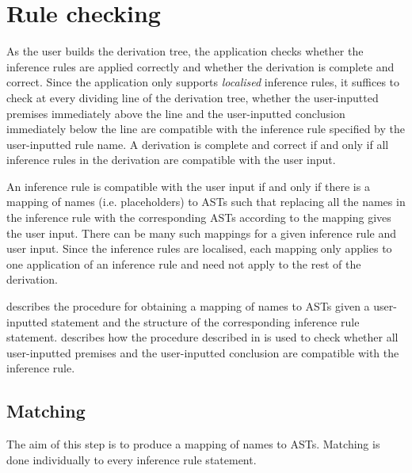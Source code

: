 \chapter{Rule checking}
\label{chapter:checking}
As the user builds the derivation tree, the application checks whether the inference rules are applied correctly and whether the derivation is complete and correct. Since the application only supports \textit{localised} inference rules, it suffices to check at every dividing line of the derivation tree, whether the user-inputted premises immediately above the line and the user-inputted conclusion immediately below the line are compatible with the inference rule specified by the user-inputted rule name. A derivation is complete and correct if and only if all inference rules in the derivation are compatible with the user input.

An inference rule is compatible with the user input if and only if there is a mapping of names (i.e. placeholders) to ASTs such that replacing all the names in the inference rule with the corresponding ASTs according to the mapping gives the user input. There can be many such mappings for a given inference rule and user input. Since the inference rules are localised, each mapping only applies to one application of an inference rule and need not apply to the rest of the derivation.

 describes the procedure for obtaining a mapping of names to ASTs given a user-inputted statement and the structure of the corresponding inference rule statement.  describes how the procedure described in  is used to check whether all user-inputted premises and the user-inputted conclusion are compatible with the inference rule.

\section{Matching}
\label{checking:matching}
The aim of this step is to produce a mapping of names to ASTs. Matching is done individually to every inference rule statement.

